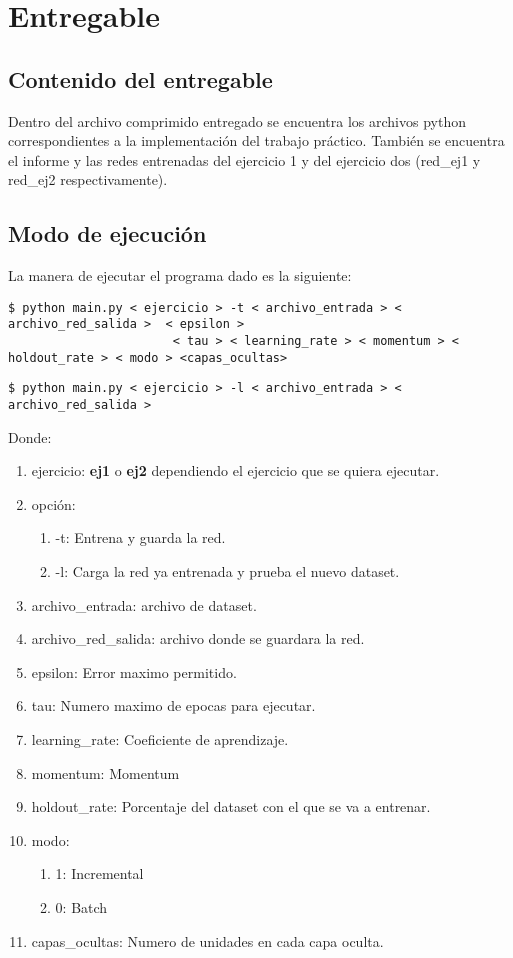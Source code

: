 \section{Entregable}
\subsection{Contenido del entregable}

Dentro del archivo comprimido entregado se encuentra los archivos python correspondientes a la implementación del trabajo práctico. También se encuentra el informe y las redes entrenadas del ejercicio 1 y del ejercicio dos (red\_ej1 y red\_ej2 respectivamente).
\subsection{Modo de ejecución}

La manera de ejecutar el programa dado es la siguiente:


\begin{verbatim}
$ python main.py < ejercicio > -t < archivo_entrada > < archivo_red_salida >  < epsilon > 
                       < tau > < learning_rate > < momentum > < holdout_rate > < modo > <capas_ocultas> 
\end{verbatim}
\begin{verbatim}
$ python main.py < ejercicio > -l < archivo_entrada > < archivo_red_salida > 
\end{verbatim}

Donde:

\begin{enumerate}
\item ejercicio: \textbf{ej1} o \textbf{ej2} dependiendo el ejercicio que se quiera ejecutar.
\item opción: 
\begin{enumerate}
\item -t: Entrena y guarda la red.
\item -l: Carga la red ya entrenada y prueba el nuevo dataset.
\end{enumerate}
\item archivo\_entrada: archivo de dataset.
\item archivo\_red\_salida: archivo donde se guardara la red.
\item epsilon: Error maximo permitido.
\item tau: Numero maximo de epocas para ejecutar.
\item learning\_rate: Coeficiente de aprendizaje.
\item momentum: Momentum
\item holdout\_rate: Porcentaje del dataset con el que se va a entrenar.
\item modo: 
\begin{enumerate}
\item 1: Incremental
\item 0: Batch
\end{enumerate}
\item capas\_ocultas: Numero de unidades en cada capa oculta.
\end{enumerate}


